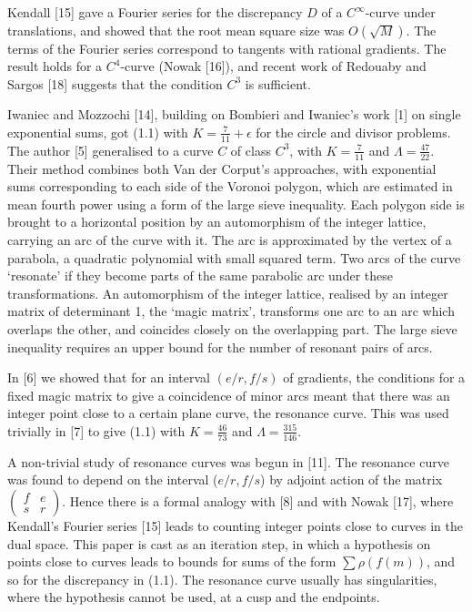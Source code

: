 \documentclass[10pt]{article}
\begin{document}
Kendall [15] gave a Fourier series for the discrepancy $D$ of a $C^{\infty}$-curve under translations, and showed that the root mean square size was $O(\sqrt{M})$. The terms of the Fourier series correspond to tangents with rational gradients. The result holds for a $C^{4}$-curve (Nowak [16]), and recent work of Redouaby and Sargos [18] suggests that the condition $C^{3}$ is sufficient.

Iwaniec and Mozzochi [14], building on Bombieri and Iwaniec's work [1] on single exponential sums, got (1.1) with $K=\frac{7}{11}+\epsilon$ for the circle and divisor problems. The author [5] generalised to a curve $C$ of class $C^{3}$, with $K=\frac{7}{11}$ and $\Lambda=\frac{47}{22}$. Their method combines both Van der Corput's approaches, with exponential sums corresponding to each side of the Voronoi polygon, which are estimated in mean fourth power using a form of the large sieve inequality. Each polygon side is brought to a horizontal position by an automorphism of the integer lattice, carrying an arc of the curve with it. The arc is approximated by the vertex of a parabola, a quadratic polynomial with small squared term. Two arcs of the curve `resonate' if they become parts of the same parabolic arc under these transformations. An automorphism of the integer lattice, realised by an integer matrix of determinant 1, the `magic matrix', transforms one arc to an arc which overlaps the other, and coincides closely on the overlapping part. The large sieve inequality requires an upper bound for the number of resonant pairs of arcs.

In [6] we showed that for an interval $(e / r, f / s)$ of gradients, the conditions for a fixed magic matrix to give a coincidence of minor arcs meant that there was an integer point close to a certain plane curve, the resonance curve. This was used trivially in [7] to give (1.1) with $K=\frac{46}{73}$ and $\Lambda=\frac{315}{146}$.

A non-trivial study of resonance curves was begun in [11]. The resonance curve was found to depend on the interval ($e / r, f / s$) by adjoint action of the matrix $\left(\begin{array}{cc}f & e \\ s & r\end{array}\right)$. Hence there is a formal analogy with [8] and with Nowak [17], where Kendall's Fourier series [15] leads to counting integer points close to curves in the dual space. This paper is cast as an iteration step, in which a hypothesis on points close to curves leads to bounds for sums of the form $\sum \rho(f(m))$, and so for the discrepancy in (1.1). The resonance curve usually has singularities, where the hypothesis cannot be used, at a cusp and the endpoints.
\end{document}
